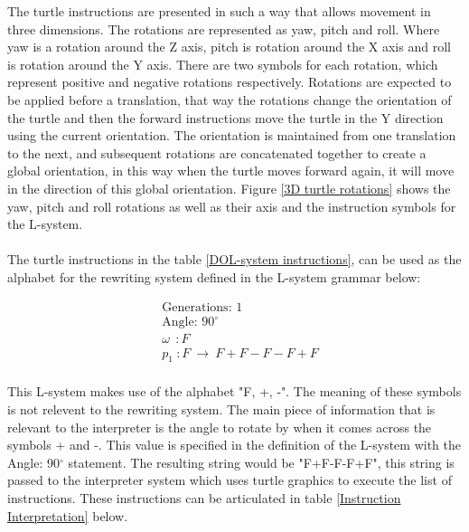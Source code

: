 \noindent
The turtle instructions are presented in such a way that allows movement in three dimensions. The rotations are represented as yaw, pitch and roll. Where yaw is a rotation around the Z axis, pitch is rotation around the X axis and roll is rotation around the Y axis. There are two symbols for each rotation, which represent positive and negative rotations respectively. Rotations are expected to be applied before a translation, that way the rotations change the orientation of the turtle and then the forward instructions move the turtle in the Y direction using the current orientation. The orientation is maintained from one translation to the next, and subsequent rotations are concatenated together to create a global orientation, in this way when the turtle moves forward again, it will move in the direction of this global orientation. Figure \ref{3D turtle rotations} shows the yaw, pitch and roll rotations as well as their axis and the instruction symbols for the L-system.\\
\\
The turtle instructions in the table \ref{DOL-system instructions}, can be used as the alphabet for the rewriting system defined in the L-system grammar below:

\begin{equation} \label{DOL-system example}
\begin{aligned}
	&\text{Generations: 1}\\
	&\text{Angle: 90$^{\circ}$}\\
	&\omega~~ : F \\
	&p_1~ :  F~ \rightarrow~ F+F-F-F+F\\
\end{aligned}
\end{equation}

\noindent
This L-system makes use of the alphabet "F, +, -". The meaning of these symbols is not relevent to the rewriting system. The main piece of information that is relevant to the interpreter is the angle to rotate by when it comes across the symbols + and -. This value is specified in the definition of the L-system with the Angle: 90$^{\circ}$ statement. The resulting string would be "F+F-F-F+F", this string is passed to the interpreter system which uses turtle graphics to execute the list of instructions. These instructions can be articulated in table \ref{Instruction Interpretation} below.

